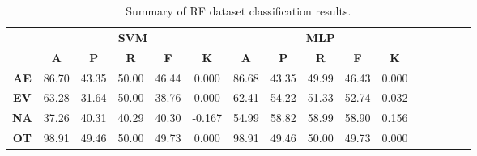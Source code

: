 \begin{landscape}
\begin{table}[htbp]
\footnotesize
\centering
\caption{Summary of RF dataset classification results.}
\label{tab:base_female}
\begin{tabular}{|c|c|c|c|c|c|c|c|c|c|c|c|c|c|c|c|}
\hline
\multirow{2}{*}{}	& \multicolumn{5}{c|}{\textbf{SVM}}												& \multicolumn{5}{c|}{\textbf{MLP}}												\\ \cline{2-11} 
					& \textbf{A}	& \textbf{P}	& \textbf{R}	& \textbf{F}	& \textbf{K}	& \textbf{A}	& \textbf{P}	& \textbf{R}	& \textbf{F}	& \textbf{K}	\\ \hline
\textbf{AE}			& 86.70			& 43.35			& 50.00			& 46.44			& 0.000			& 86.68			& 43.35			& 49.99			& 46.43			& 0.000			\\ \hline
\textbf{EV}			& 63.28			& 31.64			& 50.00			& 38.76			& 0.000			& 62.41			& 54.22			& 51.33			& 52.74			& 0.032			\\ \hline
\textbf{NA}			& 37.26			& 40.31			& 40.29			& 40.30			& -0.167			& 54.99			& 58.82			& 58.99			& 58.90			& 0.156			\\ \hline
\textbf{OT}			& 98.91			& 49.46			& 50.00			& 49.73			& 0.000			& 98.91			& 49.46			& 50.00			& 49.73			& 0.000			\\ \hline
\end{tabular}
\end{table}
\end{landscape}